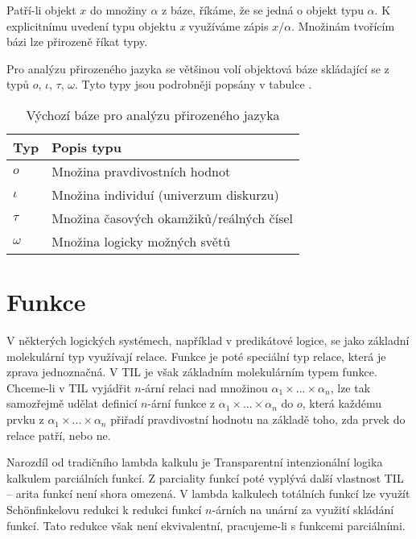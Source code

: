 Patří-li objekt $x$ do množiny $\alpha$ z báze, říkáme, že se jedná o objekt typu $\alpha$.
K explicitnímu uvedení typu objektu \textit{x} využíváme zápis $x/\alpha$. Množinám tvořícím bázi
lze přirozeně říkat typy.

Pro analýzu přirozeného jazyka se většinou volí objektová báze skládající se z typů {$o$, $\iota$,
$\tau$, $\omega$}. Tyto typy jsou podrobněji popsány v tabulce .

\begin{table}
    \caption{Výchozí báze pro analýzu přirozeného jazyka}\label{tab:default-base}
    \centering

    \begin{tabular} { | l l | }
        \hline
        Typ      & Popis typu \\
        \hline
        $o$      & Množina pravdivostních hodnot \\
        $\iota$  & Množina individuí (univerzum diskurzu) \\
        $\tau$   & Množina časových okamžiků/reálných čísel \\
        $\omega$ & Množina logicky možných světů \\
        \hline
    \end{tabular}
\end{table}

\section{Funkce}\label{fn-arity}

V některých logických systémech, například v predikátové logice, se jako základní molekulární typ
využívají relace. Funkce je poté speciální typ relace, která je zprava jednoznačná. V TIL je však
základním molekulárním typem funkce. Chceme-li v TIL vyjádřit $n$-ární relaci nad množinou
$\alpha_1 \times ... \times \alpha_n$, lze tak samozřejmě udělat definicí $n$-ární funkce
z $\alpha_1 \times ... \times \alpha_n$ do $o$, která každému prvku
z $\alpha_1 \times ... \times \alpha_n$ přiřadí pravdivostní hodnotu na základě toho, zda prvek
do relace patří, nebo ne.

Narozdíl od tradičního lambda kalkulu je Transparentní intenzionální logika kalkulem parciálních
funkcí. Z parciality funkcí poté vyplývá další vlastnost TIL -- arita funkcí není shora omezená.
V lambda kalkulech totálních funkcí lze využít Sch{\"o}nfinkelovu redukci k redukci funkcí
$n$-árních na unární za využití skládání funkcí. Tato redukce však není ekvivalentní, pracujeme-li
s funkcemi parciálními.

